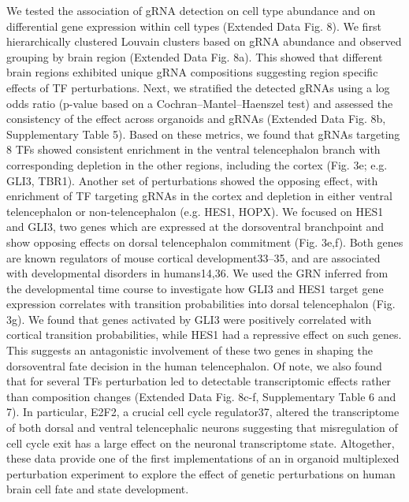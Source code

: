 We tested the association of gRNA detection on cell type abundance and on differential gene expression within cell types (Extended Data Fig. 8). We first hierarchically clustered Louvain clusters based on gRNA abundance and observed grouping by brain region (Extended Data Fig. 8a). This showed that different brain regions exhibited unique gRNA compositions suggesting region specific effects of TF perturbations. Next, we stratified the detected gRNAs using a log odds ratio (p-value based on a Cochran–Mantel–Haenszel test) and assessed the consistency of the effect across organoids and gRNAs (Extended Data Fig. 8b, Supplementary Table 5). Based on these metrics, we found that gRNAs targeting 8 TFs showed consistent enrichment in the ventral telencephalon branch with corresponding depletion in the other regions, including the cortex (Fig. 3e; e.g. GLI3, TBR1). Another set of perturbations showed the opposing effect, with enrichment of TF targeting gRNAs in the cortex and depletion in either ventral telencephalon or non-telencephalon (e.g. HES1, HOPX). We focused on HES1 and GLI3, two genes which are expressed at the dorsoventral branchpoint and show opposing effects on dorsal telencephalon commitment (Fig. 3e,f). Both genes are known regulators of mouse cortical development33–35, and are associated with developmental disorders in humans14,36. We used the GRN inferred from the developmental time course to investigate how GLI3 and HES1 target gene expression correlates with transition probabilities into dorsal telencephalon (Fig. 3g). We found that genes activated by GLI3 were positively correlated with cortical transition probabilities, while HES1 had a repressive effect on such genes. This suggests an antagonistic involvement of these two genes in shaping the dorsoventral fate decision in the human telencephalon. Of note, we also found that for several TFs perturbation led to detectable transcriptomic effects rather than composition changes (Extended Data Fig. 8c-f, Supplementary Table 6 and 7). In particular, E2F2, a crucial cell cycle regulator37, altered the transcriptome of both dorsal and ventral telencephalic neurons suggesting that misregulation of cell cycle exit has a large effect on the neuronal transcriptome state. Altogether, these data provide one of the first implementations of an in organoid multiplexed perturbation experiment to explore the effect of genetic perturbations on human brain cell fate and state development.
 


